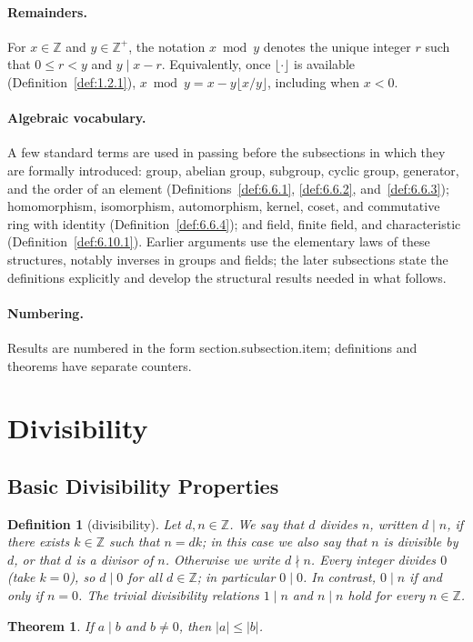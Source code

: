 \documentclass[11pt]{article}
\theoremstyle{ntstyle}
\newtheorem{theorem}{Theorem}[subsection]
\newtheorem{definition}{Definition}[subsection]
\begin{document}
\paragraph*{Remainders.}
For $x\in\mathbb{Z}$ and $y\in\mathbb{Z}^+$, the notation $x\bmod y$ denotes the unique integer $r$ such that $0\le r<y$ and $y\mid x-r$. Equivalently, once $\lfloor\cdot\rfloor$ is available (Definition~\ref{def:1.2.1}), $x\bmod y=x-y\lfloor x/y\rfloor$, including when $x<0$.

\paragraph*{Algebraic vocabulary.}
A few standard terms are used in passing before the subsections in which they are formally introduced: group, abelian group, subgroup, cyclic group, generator, and the order of an element (Definitions~\ref{def:6.6.1}, \ref{def:6.6.2}, and~\ref{def:6.6.3});
homomorphism, isomorphism, automorphism, kernel, coset, and commutative ring with identity (Definition~\ref{def:6.6.4}); and field, finite field, and characteristic (Definition~\ref{def:6.10.1}).
Earlier arguments use the elementary laws of these structures, notably inverses in groups and fields; the later subsections state the definitions explicitly and develop the structural results needed in what follows.

\paragraph*{Numbering.}
Results are numbered in the form section.subsection.item; definitions and theorems have separate counters.

\clearpage

\section{Divisibility}

\subsection{Basic Divisibility Properties}

\begin{definition}[divisibility]\label{def:1.1.1}
	Let $d,n\in\mathbb{Z}$.
	We say that $d$ divides $n$, written $d\mid n$, if there exists $k\in\mathbb{Z}$ such that $n=dk$; in this case we also say that $n$ is divisible by $d$, or that $d$ is a divisor of $n$.
	Otherwise we write $d\nmid n$.
	Every integer divides $0$ (take $k=0$), so $d\mid0$ for all $d\in\mathbb{Z}$; in particular $0\mid0$.
	In contrast, $0\mid n$ if and only if $n=0$.
	The trivial divisibility relations $1\mid n$ and $n\mid n$ hold for every $n\in\mathbb{Z}$.

\end{definition}
\begin{theorem}\label{thm:1.1.1}
	If $a\mid b$ and $b\ne0$, then $|a|\le|b|$.

\end{theorem}
\end{document}
